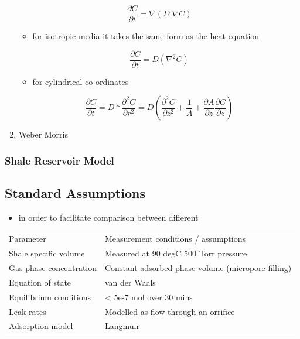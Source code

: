 \documentclass[11pt]{article}
\begin{document}
\begin{enumerate}
\begin{equation}
\frac{\partial C}{\partial t} = \nabla (D . \nabla C)
\end{equation}
\begin{itemize}
\item for isotropic media it takes the same form as the heat equation
\end{itemize}
\begin{equation}
\frac{\partial C}{\partial t} = D (\nabla^2 C)
\end{equation}
\begin{itemize}
\item for cylindrical co-ordinates
\end{itemize}
\begin{equation}
\frac{\partial C}{\partial t} = 
D * \frac{\partial^2 C}{\partial r^2} = 
D (\frac{\partial ^2 C}{\partial z ^2} + 
\frac{1}{A} + \frac{\partial A}{\partial z} \frac{\partial C}{\partial z})
\end{equation}
\item Weber Morris
\label{sec:orgde50286}
\end{enumerate}
\subsubsection{Shale Reservoir Model}
\label{sec:org279b57a}

\subsection{Standard Assumptions}
\label{sec:org1fb8021}
\begin{itemize}
\item in order to facilitate comparison between different
\end{itemize}
\begin{center}
\begin{tabular}{ll}
Parameter & Measurement conditions / assumptions\\
Shale specific volume & Measured at 90 degC 500 Torr pressure\\
Gas phase concentration & Constant adsorbed phase volume (micropore filling)\\
Equation of state & van der Waals\\
Equilibrium conditions & < 5e-7 mol over 30 mins\\
Leak rates & Modelled as flow through an orrifice\\
Adsorption model & Langmuir\\
\end{tabular}
\end{center}
\end{document}
